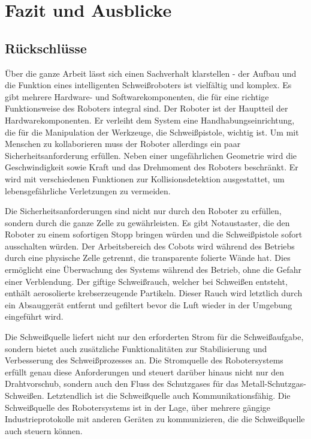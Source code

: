 \chapter{Fazit und Ausblicke}
\section{Rückschlüsse}
Über die ganze Arbeit lässt sich einen Sachverhalt klarstellen - der Aufbau und die Funktion eines intelligenten Schweißroboters ist vielfältig und komplex. Es gibt mehrere Hardware- und Softwarekomponenten, die für eine richtige Funktionsweise des Roboters integral sind. Der Roboter ist der Hauptteil der Hardwarekomponenten. Er verleiht dem System eine Handhabungseinrichtung, die für die Manipulation der Werkzeuge, die Schweißpistole, wichtig ist. Um mit Menschen zu kollaborieren muss der Roboter allerdings ein paar Sicherheitsanforderung erfüllen. Neben einer ungefährlichen Geometrie wird die Geschwindigkeit sowie Kraft und das Drehmoment des Roboters beschränkt. Er wird mit verschiedenen Funktionen zur Kollisionsdetektion ausgestattet, um lebensgefährliche Verletzungen zu vermeiden.

Die Sicherheitsanforderungen sind nicht nur durch den Roboter zu erfüllen, sondern durch die ganze Zelle zu gewährleisten. Es gibt Notaustaster, die den Roboter zu einem sofortigen Stopp bringen würden und die Schweißpistole sofort ausschalten würden. Der Arbeitsbereich des Cobots wird während des Betriebs durch eine physische Zelle getrennt, die transparente folierte Wände hat. Dies ermöglicht eine Überwachung des Systems während des Betrieb, ohne die Gefahr einer Verblendung. Der giftige Schweißrauch, welcher bei Schweißen entsteht, enthält aerosolierte krebserzeugende Partikeln. Dieser Rauch wird letztlich durch ein Absauggerät entfernt und gefiltert bevor die Luft wieder in der Umgebung eingeführt wird.

Die Schweißquelle liefert nicht nur den erforderten Strom für die Schweißaufgabe, sondern bietet auch zusätzliche Funktionalitäten zur Stabilisierung und Verbesserung des Schweißprozesses an. Die Stromquelle des Robotersystems erfüllt genau diese Anforderungen und steuert darüber hinaus nicht nur den Drahtvorschub, sondern auch den Fluss des Schutzgases für das Metall-Schutzgas-Schweißen. Letztendlich ist die Schweißquelle auch Kommunikationsfähig. Die Schweißquelle des Robotersystems ist in der Lage, über mehrere gängige Industrieprotokolle mit anderen Geräten zu kommunizieren, die die Schweißquelle auch steuern können. 


